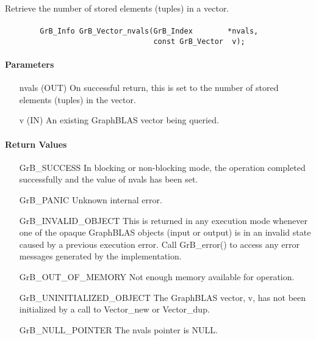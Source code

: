 Retrieve the number of stored elements (tuples) in a vector.

\paragraph{\syntax}

\begin{verbatim}
        GrB_Info GrB_Vector_nvals(GrB_Index        *nvals,
                                  const GrB_Vector  v);
\end{verbatim}

\paragraph{Parameters}

\begin{itemize}[leftmargin=1.1in]
    \item[{\sf nvals}] ({\sf OUT}) On successful return, this is set to the number of 
                                   stored elements (tuples) in the vector.
    \item[{\sf v}]     ({\sf IN})  An existing GraphBLAS vector being queried.
\end{itemize}


\paragraph{Return Values}

\begin{itemize}[leftmargin=2.1in]
    \item[{\sf GrB\_SUCCESS}]  In blocking or non-blocking mode, the operation 
    completed successfully and the value of {\sf nvals} has been set. 

    \item[{\sf GrB\_PANIC}]    Unknown internal error.
    
    \item[{\sf GrB\_INVALID\_OBJECT}] This is returned in any execution mode 
    whenever one of the opaque GraphBLAS objects (input or output) is in an invalid 
    state caused by a previous execution error.  Call {\sf GrB\_error()} to access 
    any error messages generated by the implementation.

    \item[{\sf GrB\_OUT\_OF\_MEMORY}] Not enough memory available for operation.
    
    \item[{\sf GrB\_UNINITIALIZED\_OBJECT}]  The GraphBLAS vector, {\sf v}, has 
    not been initialized by a call to {\sf Vector\_new} or {\sf Vector\_dup}.
    
    \item[{\sf GrB\_NULL\_POINTER}]  The {\sf nvals} pointer is {\sf NULL}.
\end{itemize}

